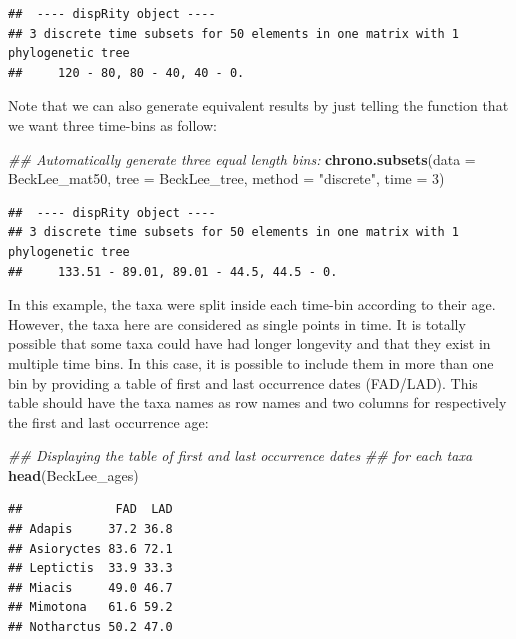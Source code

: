 \documentclass[
]{book}
\newenvironment{Shaded}{\begin{snugshade}}{\end{snugshade}}
\newcommand{\CommentTok}[1]{\textcolor[rgb]{0.56,0.35,0.01}{\textit{#1}}}
\newcommand{\DataTypeTok}[1]{\textcolor[rgb]{0.13,0.29,0.53}{#1}}
\newcommand{\DecValTok}[1]{\textcolor[rgb]{0.00,0.00,0.81}{#1}}
\newcommand{\KeywordTok}[1]{\textcolor[rgb]{0.13,0.29,0.53}{\textbf{#1}}}
\newcommand{\NormalTok}[1]{#1}
\newcommand{\StringTok}[1]{\textcolor[rgb]{0.31,0.60,0.02}{#1}}
\begin{document}
\begin{verbatim}
##  ---- dispRity object ---- 
## 3 discrete time subsets for 50 elements in one matrix with 1 phylogenetic tree
##     120 - 80, 80 - 40, 40 - 0.
\end{verbatim}

Note that we can also generate equivalent results by just telling the function that we want three time-bins as follow:

\begin{Shaded}
\begin{Highlighting}[]
\CommentTok{\#\# Automatically generate three equal length bins:}
\KeywordTok{chrono.subsets}\NormalTok{(}\DataTypeTok{data =}\NormalTok{ BeckLee\_mat50, }\DataTypeTok{tree =}\NormalTok{ BeckLee\_tree,}
               \DataTypeTok{method =} \StringTok{"discrete"}\NormalTok{,}
               \DataTypeTok{time =} \DecValTok{3}\NormalTok{)}
\end{Highlighting}
\end{Shaded}

\begin{verbatim}
##  ---- dispRity object ---- 
## 3 discrete time subsets for 50 elements in one matrix with 1 phylogenetic tree
##     133.51 - 89.01, 89.01 - 44.5, 44.5 - 0.
\end{verbatim}

In this example, the taxa were split inside each time-bin according to their age.
However, the taxa here are considered as single points in time.
It is totally possible that some taxa could have had longer longevity and that they exist in multiple time bins.
In this case, it is possible to include them in more than one bin by providing a table of first and last occurrence dates (FAD/LAD).
This table should have the taxa names as row names and two columns for respectively the first and last occurrence age:

\begin{Shaded}
\begin{Highlighting}[]
\CommentTok{\#\# Displaying the table of first and last occurrence dates}
\CommentTok{\#\# for each taxa}
\KeywordTok{head}\NormalTok{(BeckLee\_ages)}
\end{Highlighting}
\end{Shaded}

\begin{verbatim}
##             FAD  LAD
## Adapis     37.2 36.8
## Asioryctes 83.6 72.1
## Leptictis  33.9 33.3
## Miacis     49.0 46.7
## Mimotona   61.6 59.2
## Notharctus 50.2 47.0
\end{verbatim}
\end{document}
